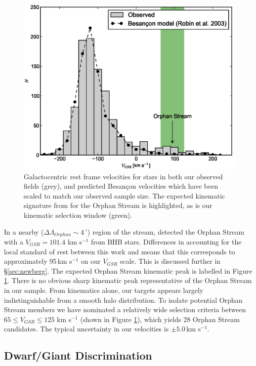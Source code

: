 \documentclass[10pt,apjl]{emulateapj}
\begin{document}
\begin{figure}[h]
	\includegraphics[width=\columnwidth]{./fig1.eps}
	\caption{Galactocentric rest frame velocities for stars in both our observed fields (grey), and predicted Besan\c{c}on velocities which have been scaled to match our observed sample size. The expected kinematic signature from \citet{Newberg_et-al_2010} for the Orphan Stream is highlighted, as is our kinematic selection window (green).}
	\label{fig:velocities}
\end{figure}
 

In a nearby ($\Delta\Lambda_{Orphan} \sim 4\,^\circ$) region of the stream, \citet{Newberg_et-al_2010} detected the Orphan Stream with a $V_{GSR} = 101.4$ km s$^{-1}$ from BHB stars. Differences in accounting for the local standard of rest between this work and \citet{Newberg_et-al_2010} means that this corresponds to approximately 95\,km s$^{-1}$ on our $V_{GSR}$ scale.  This is discussed further in \S\ref{sec:newberg}. The expected Orphan Stream kinematic peak is labelled in Figure \ref{fig:velocities}. There is no obvious sharp kinematic peak representative of the Orphan Stream in our sample. From kinematics alone, our targets appears largely indistinguishable from a smooth halo distribution. To isolate potential Orphan Stream members we have nominated a relatively wide selection criteria between $65 \leq V_{GSR} \leq 125$ km s$^{-1}$ (shown in Figure \ref{fig:velocities}), which yields 28 Orphan Stream candidates. The typical uncertainty in our velocities is $\pm{}5.0$\,km s$^{-1}$.

\subsection{Dwarf/Giant Discrimination}
\label{sec:dwarf-giant}
\end{document}
